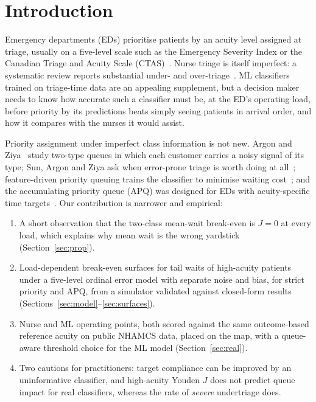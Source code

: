 \documentclass[conference]{IEEEtran}
\begin{document}
\section{Introduction}

Emergency departments (EDs) prioritise patients by an acuity level assigned at triage,
usually on a five-level scale such as the Emergency Severity Index or the Canadian
Triage and Acuity Scale (CTAS)~\cite{bullard2017ctas}. Nurse triage is itself imperfect:
a systematic review reports substantial under- and over-triage~\cite{hinson2019triage}.
ML classifiers trained on triage-time data are an appealing supplement, but a decision
maker needs to know how accurate such a classifier must be, at the ED's operating
load, before priority by its predictions beats simply seeing patients in arrival
order, and how it compares with the nurses it would assist.

Priority assignment under imperfect class information is not new. Argon and
Ziya~\cite{argon2009priority} study two-type queues in which each customer carries a
noisy signal of its type; Sun, Argon and Ziya ask when error-prone triage is worth
doing at all~\cite{sun2022triage,sun2018austere}; feature-driven priority queuing trains
the classifier to minimise waiting cost~\cite{fdpq2024}; and the accumulating priority
queue (APQ) was designed for EDs with acuity-specific time
targets~\cite{stanford2014apq}. Our contribution is narrower and empirical:
\begin{enumerate}
\item A short observation that the two-class mean-wait break-even is $J=0$ at every
load, which explains why mean wait is the wrong yardstick (Section~\ref{sec:prop}).
\item Load-dependent break-even surfaces for tail waits of high-acuity patients under a
five-level ordinal error model with separate noise and bias, for strict priority and
APQ, from a simulator validated against closed-form results (Sections~\ref{sec:model}--\ref{sec:surfaces}).
\item Nurse and ML operating points, both scored against the same outcome-based
reference acuity on public NHAMCS data, placed on the map, with a queue-aware
threshold choice for the ML model (Section~\ref{sec:real}).
\item Two cautions for practitioners: target compliance can be improved by an
uninformative classifier, and high-acuity Youden $J$ does not predict queue impact
for real classifiers, whereas the rate of \emph{severe} undertriage does.
\end{enumerate}
\end{document}
